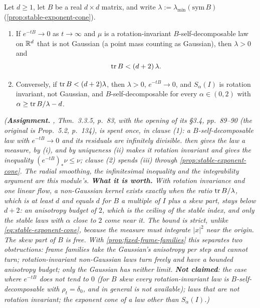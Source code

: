 \begin{proposition}
\label{prop:anisotropy-budget}
\leanok
Let $d \ge 1$, let $B$ be a real $d \times d$ matrix, and write
$\lambda := \lambda_{\min}(\mathrm{sym}\,B)$ (\ref{prop:stable-exponent-cone}).
\begin{enumerate}
\item If $e^{-tB} \to 0$ as $t \to \infty$ and $\mu$ is a rotation-invariant $B$-self-decomposable
law on $\mathbb{R}^d$ that is not Gaussian (a point mass counting as Gaussian), then $\lambda > 0$ and
\[
  \operatorname{tr} B < (d+2)\,\lambda .
\]
\item Conversely, if $\operatorname{tr} B < (d+2)\lambda$, then $\lambda > 0$, $e^{-tB} \to 0$, and $S_\alpha(I)$ is
rotation invariant, not Gaussian, and $B$-self-decomposable for every $\alpha \in (0,2)$ with
$\alpha \ge \operatorname{tr} B/\lambda - d$.
\end{enumerate}
\statusA\quad{}\quad{}\quad\emph{(\textbf{Assignment.} ,
 Thm.~3.3.5, p.~83, with the opening of its \S 3.4, pp.~89--90 (the
original is  Prop.~5.2, p.~134), is spent once, in clause (1): a
$B$-self-decomposable law with $e^{-tB} \to 0$ and its residuals are infinitely divisible.
 then gives the law a \Levy{} measure, by (i), and by uniqueness (ii) makes it rotation
invariant and gives the inequality $(e^{-tB})_*\nu \le \nu$; clause (2) spends (iii)
through \ref{prop:stable-exponent-cone}. The radial smoothing, the infinitesimal inequality and the
integrability argument are this module's. \textbf{What it is worth.} With rotation invariance and
one linear flow, a non-Gaussian kernel exists exactly when the ratio $\operatorname{tr} B/\lambda$, which is at
least $d$ and equals $d$ for $B$ a multiple of $I$ plus a skew part, stays below $d + 2$: an
anisotropy budget of $2$, which is the ceiling of the stable index, and only the stable laws with
$\alpha$ close to $2$ come near it. The bound is strict, unlike \ref{eq:stable-exponent-cone}, because
the \Levy{} measure must integrate $|x|^2$ near the origin. The skew part of $B$ is free. With
\ref{prop:fixed-frame-families} this separates two obstructions: frame families take the
Gaussian's anisotropy per step and cannot turn; rotation-invariant non-Gaussian laws turn freely and have a bounded anisotropy
budget; only the Gaussian has neither limit. \textbf{Not claimed}: the case where $e^{-tB}$ does not
tend to $0$ (for $B$ skew every rotation-invariant law is $B$-self-decomposable with
$\rho_t = \delta_0$, and in general  is not available); laws that are not rotation
invariant; the exponent cone of a law other than $S_\alpha(I)$.)}
\end{proposition}

